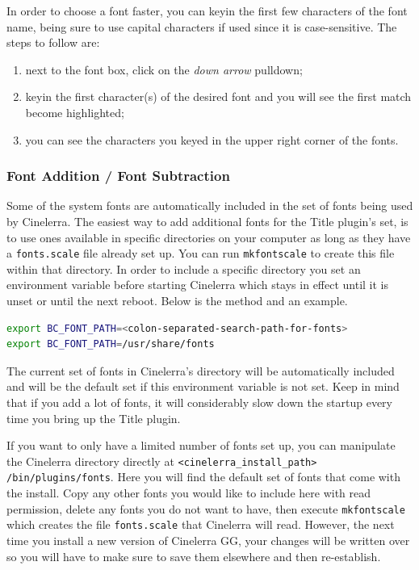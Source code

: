 {In order to choose a font faster, you can keyin the first few characters of the font name, being sure to use capital characters if used since it is case-sensitive. The steps to follow are:

\begin{enumerate}
    \item next to the font box, click on the \textit{down arrow} pulldown;
    \item keyin the first character(s) of the desired font and you will see the first match become highlighted;
    \item you can see the characters you keyed in the upper right corner of the fonts.
\end{enumerate}

\subsubsection*{Font Addition / Font Subtraction}%
\label{ssub:font_addition_subtraction}

Some of the system fonts are automatically included in the set of fonts being used by Cinelerra. The easiest way to add additional fonts for the Title plugin's set, is to use ones available in specific directories on your computer as long as they have a \texttt{fonts.scale} file already set up. You can run \texttt{mkfontscale} to create this file within that directory. In order to include a specific directory you set an environment variable before starting Cinelerra which stays in effect until it is unset or until the next reboot. Below is the method and an example.

\vspace{1ex}
\begin{lstlisting}[language=Bash,numbers=none]
export BC_FONT_PATH=<colon-separated-search-path-for-fonts>
export BC_FONT_PATH=/usr/share/fonts
\end{lstlisting}

The current set of fonts in Cinelerra's directory will be automatically included and will be the default set if this environment variable is not set. Keep in mind that if you add a lot of fonts, it will considerably slow down the startup every time you bring up the Title plugin. 

If you want to only have a limited number of fonts set up, you can manipulate the Cinelerra directory directly at \texttt{<cinelerra\_install\_path> /bin/plug\-ins/fonts}. 
Here you will find the default set of fonts that come with the install. Copy any other fonts you would like to include here with read permission, delete any fonts you do not want to have, then execute \texttt{mkfontscale} which creates the file \texttt{fonts.scale} that Cinelerra will read. However, the next time you install a new version of Cinelerra GG, your changes will be written over so you will have to make sure to save them elsewhere and then re-establish. 

}
